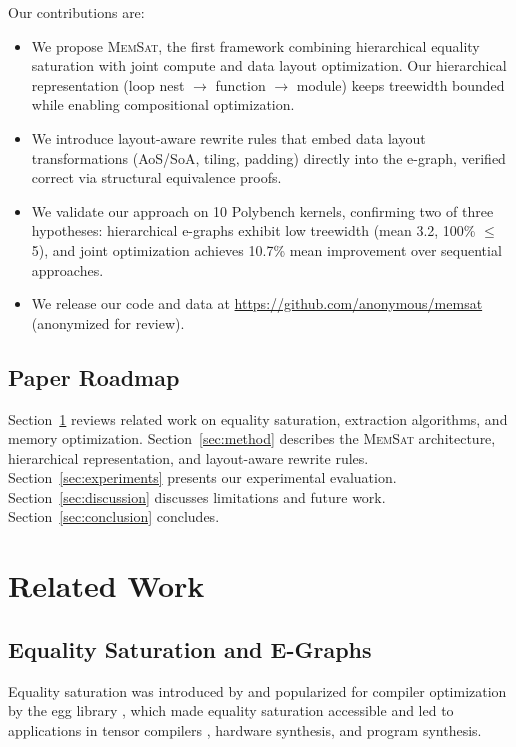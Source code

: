 \documentclass[11pt]{article}
\newcommand{\memsat}{\textsc{MemSat}}
\begin{document}
Our contributions are:
\begin{itemize}
    \item We propose \memsat, the first framework combining hierarchical equality saturation with joint compute and data layout optimization. Our hierarchical representation (loop nest $\rightarrow$ function $\rightarrow$ module) keeps treewidth bounded while enabling compositional optimization.
    \item We introduce layout-aware rewrite rules that embed data layout transformations (AoS/SoA, tiling, padding) directly into the e-graph, verified correct via structural equivalence proofs.
    \item We validate our approach on 10 Polybench kernels, confirming two of three hypotheses: hierarchical e-graphs exhibit low treewidth (mean 3.2, 100\% $\leq$ 5), and joint optimization achieves 10.7\% mean improvement over sequential approaches.
    \item We release our code and data at \url{https://github.com/anonymous/memsat} (anonymized for review).
\end{itemize}

\subsection{Paper Roadmap}

Section~\ref{sec:related} reviews related work on equality saturation, extraction algorithms, and memory optimization. Section~\ref{sec:method} describes the \memsat{} architecture, hierarchical representation, and layout-aware rewrite rules. Section~\ref{sec:experiments} presents our experimental evaluation. Section~\ref{sec:discussion} discusses limitations and future work. Section~\ref{sec:conclusion} concludes.

\section{Related Work}
\label{sec:related}

\subsection{Equality Saturation and E-Graphs}

Equality saturation was introduced by \citet{tate2009equality} and popularized for compiler optimization by the egg library \citep{willsey2021egg}, which made equality saturation accessible and led to applications in tensor compilers \citep{yang2021equality}, hardware synthesis, and program synthesis.
\end{document}
